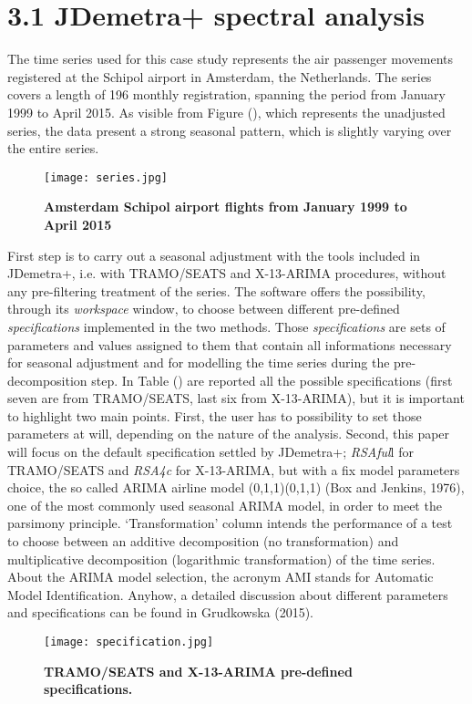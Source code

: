 \documentclass{article}
\begin{document}
\section*{\small 3.1 JDemetra+ spectral analysis}
The time series used for this case study represents the air passenger movements registered at the Schipol airport in Amsterdam, the Netherlands. The series covers a length of 196 monthly registration, spanning the period from January 1999 to April 2015. As visible from Figure (), which represents the unadjusted series, the data present a strong seasonal pattern, which is slightly varying over the entire series.
\begin{figure}[H]
  \centering
  \texttt{[image: series.jpg]}
  \caption{\textbf{\footnotesize Amsterdam Schipol airport flights from January 1999 to April 2015}}
  \label{fig:1}
\end{figure}
First step is to carry out a seasonal adjustment with the tools included in JDemetra+, i.e. with TRAMO/SEATS and X-13-ARIMA procedures, without any pre-filtering treatment of the series. The software offers the possibility, through its \textit{workspace} window, to choose between different pre-defined \textit{specifications} implemented in the two methods. Those \textit{specifications} are sets of parameters and values assigned to them that contain all informations necessary for seasonal adjustment and for modelling the time series during the pre-decomposition step. In Table () are reported all the possible specifications (first seven are from TRAMO/SEATS, last six from X-13-ARIMA), but it is important to highlight two main points. First, the user has to possibility to set those parameters at will, depending on the nature of the analysis. Second, this paper will focus on the default specification settled by JDemetra+; \textit{RSAful}l for TRAMO/SEATS and \textit{RSA4c} for X-13-ARIMA, but with a fix model parameters choice, the so called ARIMA airline model (0,1,1)(0,1,1) (Box and Jenkins, 1976), one of the most commonly used seasonal ARIMA model, in order to meet the parsimony principle. `Transformation' column intends the performance of a test to choose between an additive decomposition (no transformation) and multiplicative decomposition (logarithmic transformation) of the time series. About the ARIMA model selection, the acronym AMI stands for Automatic Model Identification. Anyhow, a detailed discussion about different parameters and specifications can be found in Grudkowska (2015).
\begin{figure}[H]
\centering
  \texttt{[image: specification.jpg]}
  \caption{\textbf{\footnotesize TRAMO/SEATS and X-13-ARIMA pre-defined specifications. }}
  \label{fig:2}
\end{figure}
\end{document}
